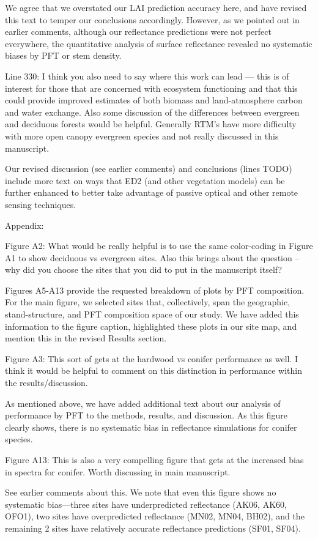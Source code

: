 We agree that we overstated our LAI prediction accuracy here, and have revised this text to temper our conclusions accordingly.
However, as we pointed out in earlier comments, although our reflectance predictions were not perfect everywhere, the quantitative analysis of surface reflectance revealed no systematic biases by PFT or stem density.

\begin{reviewer}
  Line 330: I think you also need to say where this work can lead — this is of interest for those that are concerned with ecosystem functioning and that this could provide improved estimates of both biomass and land-atmosphere carbon and water exchange. Also some discussion of the differences between evergreen and deciduous forests would be helpful. Generally RTM’s have more difficulty with more open canopy evergreen species and not really discussed in this manuscript.
\end{reviewer}

Our revised discussion (see earlier comments) and conclusions (lines TODO) include more text on ways that ED2 (and other vegetation models) can be further enhanced to better take advantage of passive optical and other remote sensing techniques.

\begin{reviewer}
Appendix:

Figure A2: What would be really helpful is to use the same color-coding in Figure A1 to show deciduous vs evergreen sites. Also this brings about the question – why did you choose the sites that you did to put in the manuscript itself?
\end{reviewer}

Figures A5-A13 provide the requested breakdown of plots by PFT composition.
For the main figure, we selected sites that, collectively, span the geographic, stand-structure, and PFT composition space of our study.
We have added this information to the figure caption, highlighted these plots in our site map, and mention this in the revised Results section.

\begin{reviewer}
  Figure A3: This sort of gets at the hardwood vs conifer performance as well. I think it would be helpful to comment on this distinction in performance within the results/discussion.
\end{reviewer}

As mentioned above, we have added additional text about our analysis of performance by PFT to the methods, results, and discussion.
As this figure clearly shows, there is no systematic bias in reflectance simulations for conifer species.

\begin{reviewer}
  Figure A13: This is also a very compelling figure that gets at the increased bias in spectra for conifer. Worth discussing in main manuscript.
\end{reviewer}

See earlier comments about this.
We note that even this figure shows no systematic bias---three sites have underpredicted reflectance (AK06, AK60, OFO1), two sites have overpredicted reflectance (MN02, MN04, BH02), and the remaining 2 sites have relatively accurate reflectance predictions (SF01, SF04).
